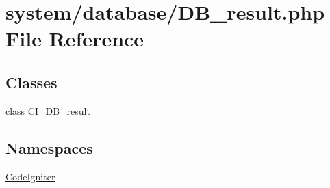 \hypertarget{_d_b__result_8php}{}\section{system/database/\+D\+B\+\_\+result.php File Reference}
\label{_d_b__result_8php}
\subsection*{Classes}
\begin{DoxyCompactItemize}
\item 
class \mbox{\hyperlink{class_c_i___d_b__result}{C\+I\+\_\+\+D\+B\+\_\+result}}
\end{DoxyCompactItemize}
\subsection*{Namespaces}
\begin{DoxyCompactItemize}
\item 
 \mbox{\hyperlink{namespace_code_igniter}{Code\+Igniter}}
\end{DoxyCompactItemize}
